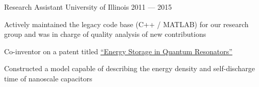 \begin{cventries}
  \cventry%
  {Research Assistant} %
  {University of Illinois}
  {\color{awesome}{Center for Complex Systems Research}} %
  {2011 --- 2015}
  {
  \begin{cvitems}%
    \item{Actively maintained the legacy code base (C++ / MATLAB) for our
      research group and was in charge of quality analysis of new
      contributions}
    \item{%
        Co-inventor on a patent titled %
        \href{https://experts.illinois.edu/en/publications/energy-storage-in-quantum-resonators}{%
          ``Energy Storage in Quantum Resonators''
      }}
    \item{Constructed a model capable of describing the energy density and
      self-discharge time of nanoscale capacitors}
  \end{cvitems}%
  }

\end{cventries}

